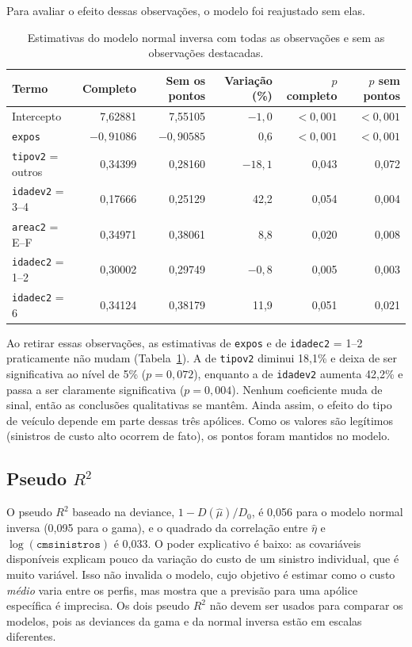 Para avaliar o efeito dessas observações, o modelo foi reajustado sem elas.

\begin{table}[H]
\centering\small
\caption{Estimativas do modelo normal inversa com todas as observações e sem as observações destacadas.}\label{tab:ex1sem}
\begin{tabular}{lrrrrr}
\toprule
Termo & Completo & Sem os pontos & Variação (\%) & $p$ completo & $p$ sem pontos \\
\midrule
Intercepto & 7,62881 & 7,55105 & $-1{,}0$ & $<0{,}001$ & $<0{,}001$ \\
\texttt{expos} & $-0{,}91086$ & $-0{,}90585$ & 0,6 & $<0{,}001$ & $<0{,}001$ \\
\texttt{tipov2} = outros & 0,34399 & 0,28160 & $-18{,}1$ & 0,043 & 0,072 \\
\texttt{idadev2} = 3--4 & 0,17666 & 0,25129 & 42,2 & 0,054 & 0,004 \\
\texttt{areac2} = E--F & 0,34971 & 0,38061 & 8,8 & 0,020 & 0,008 \\
\texttt{idadec2} = 1--2 & 0,30002 & 0,29749 & $-0{,}8$ & 0,005 & 0,003 \\
\texttt{idadec2} = 6 & 0,34124 & 0,38179 & 11,9 & 0,051 & 0,021 \\
\bottomrule
\end{tabular}
\end{table}

Ao retirar essas observações, as estimativas de \texttt{expos} e de \texttt{idadec2} = 1--2 praticamente não mudam (Tabela~\ref{tab:ex1sem}). A de \texttt{tipov2} diminui 18,1\% e deixa de ser significativa ao nível de 5\% ($p=0{,}072$), enquanto a de \texttt{idadev2} aumenta 42,2\% e passa a ser claramente significativa ($p=0{,}004$). Nenhum coeficiente muda de sinal, então as conclusões qualitativas se mantêm. Ainda assim, o efeito do tipo de veículo depende em parte dessas três apólices. Como os valores são legítimos (sinistros de custo alto ocorrem de fato), os pontos foram mantidos no modelo.

\subsection*{Pseudo $R^2$}

O pseudo $R^2$ baseado na deviance, $1-D(\hat\mu)/D_0$, é 0,056 para o modelo normal inversa (0,095 para o gama), e o quadrado da correlação entre $\hat\eta$ e $\log(\texttt{cmsinistros})$ é 0,033. O poder explicativo é baixo: as covariáveis disponíveis explicam pouco da variação do custo de um sinistro individual, que é muito variável. Isso não invalida o modelo, cujo objetivo é estimar como o custo \emph{médio} varia entre os perfis, mas mostra que a previsão para uma apólice específica é imprecisa. Os dois pseudo $R^2$ não devem ser usados para comparar os modelos, pois as deviances da gama e da normal inversa estão em escalas diferentes.

